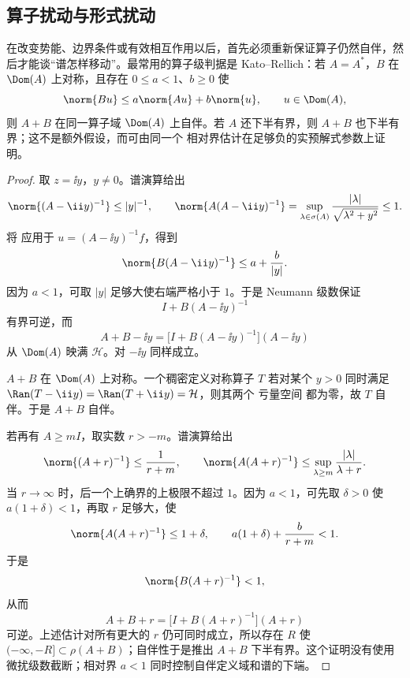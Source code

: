 \subsection{算子扰动与形式扰动}

\begin{theorem}
在改变势能、边界条件或有效相互作用以后，首先必须重新保证算子仍然自伴，然后才能谈“谱怎样移动”。最常用的算子级判据是 Kato--Rellich：若 $A=A^*$，$B$ 在 $\Dom(A)$ 上对称，且存在 $0\le a<1$、$b\ge0$ 使
\begin{equation}\label{eq:math-sl-kato-relative-bound}
 \norm{Bu}\le a\norm{Au}+b\norm{u},
 \qquad u\in\Dom(A),
\end{equation}
则 $A+B$ 在同一算子域 $\Dom(A)$ 上自伴。若 $A$ 还下半有界，则 $A+B$ 也下半有界；这不是额外假设，而可由同一个 相对界估计在足够负的实预解式参数上证明。\end{theorem}
\begin{proof}
取 $z=\ii y$，$y\ne0$。谱演算给出
\[
 \norm{(A-\ii y)^{-1}}\le |y|^{-1},
 \qquad
 \norm{A(A-\ii y)^{-1}}
 =\sup_{\lambda\in\sigma(A)}\frac{|\lambda|}{\sqrt{\lambda^2+y^2}}
 \le1.
\]
将 应用于 $u=(A-\ii y)^{-1}f$，得到
\[
 \norm{B(A-\ii y)^{-1}}
 \le a+\frac{b}{|y|}.
\]
因为 $a<1$，可取 $|y|$ 足够大使右端严格小于 $1$。于是 Neumann 级数保证
\[
 I+B(A-\ii y)^{-1}
\]
有界可逆，而
\[
 A+B-\ii y
 =\bigl[I+B(A-\ii y)^{-1}\bigr](A-\ii y)
\]
从 $\Dom(A)$ 映满 $\mathcal H$。对 $-\ii y$ 同样成立。

$A+B$ 在 $\Dom(A)$ 上对称。一个稠密定义对称算子 $T$ 若对某个 $y>0$ 同时满足
$\Ran(T-\ii y)=\Ran(T+\ii y)=\mathcal H$，则其两个 亏量空间 都为零，故 $T$ 自伴。于是 $A+B$ 自伴。

若再有 $A\ge mI$，取实数 $r>-m$。谱演算给出
\[
 \norm{(A+r)^{-1}}\le\frac1{r+m},
 \qquad
 \norm{A(A+r)^{-1}}
 \le\sup_{\lambda\ge m}\frac{|\lambda|}{\lambda+r}.
\]
当 $r\to\infty$ 时，后一个上确界的上极限不超过 $1$。因为 $a<1$，可先取 $\delta>0$ 使 $a(1+\delta)<1$，再取 $r$ 足够大，使
\[
 \norm{A(A+r)^{-1}}\le1+\delta,
 \qquad
 a(1+\delta)+\frac b{r+m}<1.
\]
于是
\[
 \norm{B(A+r)^{-1}}<1,
\]
从而
\[
 A+B+r
 =\bigl[I+B(A+r)^{-1}\bigr](A+r)
\]
可逆。上述估计对所有更大的 $r$ 仍可同时成立，所以存在 $R$ 使
$(-\infty,-R]\subset\rho(A+B)$；自伴性于是推出 $A+B$ 下半有界。这个证明没有使用微扰级数截断；相对界 $a<1$ 同时控制自伴定义域和谱的下端。\end{proof}

